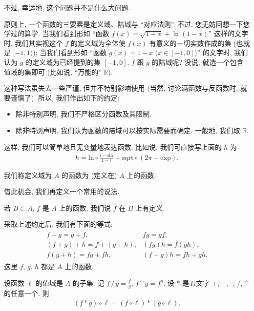 不过, 幸运地, 这个问题并不是什么大问题.

原则上, 一个函数的三要素是定义域、陪域与 ``对应法则''. 不过, 您无妨回想一下您学过的算学. 当我们看到形如 ``函数 $f(x) = \sqrt{1 + x} + \operatorname{ln} {(1 - x)}$'' 这样的文字时, 我们其实视这个 $f$ 的定义域为全体使 $f(x)$ 有意义的一切实数作成的集 (也就是 $[-1, 1)$); 当我们看到形如 ``函数 $g(x) = 1 - x$ ($x \in [-1, 0]$)'' 的文字时, 我们认为 $g$ 的定义域为已经提到的集 $[-1, 0]$. $f$ 跟 $g$ 的陪域呢? 没说, 就选一个包含值域的集即可 (比如说, ``万能的'' $\mathbb{R}$).

这种写法虽失去一些严谨, 但并不特别影响使用 (当然, 讨论满函数与反函数时, 就要谨慎了). 所以, 我们作出如下的约定:
\begin{itemize}
    \item 除非特别声明, 我们不严格区分函数及其限制.
    \item 除非特别声明, 我们认为函数的陪域可以按实际需要而确定. 一般地, 我们取 $\mathbb{R}$.
\end{itemize}
这样, 我们可以简单地且无变量地表达函数. 比如说, 我们可直接写上面的 $h$ 为
\begin{align*}
    h = {\mathrm{ln}} \circ \frac{\iota - \mathrm{sin}}{1 - \iota} + \mathrm{sqrt} \circ (2\pi - \mathrm{exp}).
\end{align*}

\begin{definition}
    我们称定义域为 $A$ 的函数为 (定义在) $A$ 上的函数.
\end{definition}

借此机会, 我们再定义一个常用的说法.

\begin{definition}
    若 $B \subset A$, $f$ 是 $A$ 上的函数, 我们说 $f$ 在 $B$ 上有定义.
\end{definition}

采取上述约定后, 我们有下面的等式:
\begin{align*}
    \begin{array}{ll}
        f + g = g + f,             & fg = gf,            \\
        (f + g) + h = f + (g + h), & (fg)h = f(gh),      \\
        f(g + h) = fg + fh,        & (f + g)h = fh + gh.
    \end{array}
\end{align*}
这里 $f$, $g$, $h$ 都是 $A$ 上的函数.

设函数 $\ell$ 的值域是 $A$ 的子集. 记 $f \, / \, g = \frac{f}{g}$, $f \, \text{\textasciicircum} \, g = f^g$. 设 $\ast$ 是五文字 $+$, $-$, $\cdot$, $/$, $\text{\textasciicircum}$ 的任意一个. 则
\begin{align*}
    (f \ast g) \circ \ell = (f \circ \ell) \ast (g \circ \ell).
\end{align*}

